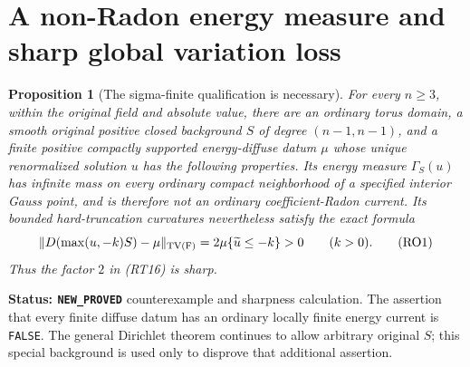 \documentclass[11pt,a4paper]{article}
\numberwithin{equation}{section}
\newtheorem{proposition}[theorem]{Proposition}
\theoremstyle{definition}
\theoremstyle{remark}
\begin{document}


\section{A non-Radon energy measure and sharp global variation loss}
\label{sec:r11-energy-Radon-obstruction}

\begin{proposition}[The sigma-finite qualification is necessary]
\label{prop:r11-diffuse-energy-not-Radon}
For every $n\ge3$, within the original field and absolute value,
there are an ordinary torus domain, a smooth original positive
closed background $S$ of degree $(n-1,n-1)$, and a finite positive
compactly supported energy-diffuse datum $\mu$ whose unique
renormalized solution $u$ has the following properties.
Its energy measure $\Gamma_S(u)$ has infinite mass on every
ordinary compact neighborhood of a specified interior Gauss
point, and is therefore not an ordinary coefficient-Radon
current.  Its bounded hard-truncation curvatures nevertheless
satisfy the exact formula
\[
 \|D(\max(u,-k)S)-\mu\|_{\rm TV(F)}
                  =2\mu\{\widetilde u\le-k\}>0
                         \qquad(k>0).
 \tag{RO1}
\]
Thus the factor $2$ in (RT16) is sharp.
\end{proposition}

\noindent\textbf{Status: \texttt{NEW\_PROVED}} counterexample
and sharpness calculation.  The assertion that every finite
diffuse datum has an ordinary locally finite energy current
is \texttt{FALSE}.  The general Dirichlet theorem continues
to allow arbitrary original $S$; this special background is
used only to disprove that additional assertion.
\end{document}
